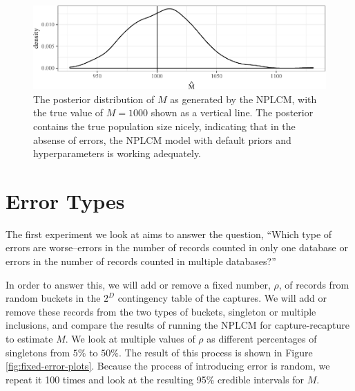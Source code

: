 \documentclass[]{article}
\begin{document}
\begin{figure}
\centering
\includegraphics{singleton_errors_files/figure-latex/true-plot-1.pdf}
\caption{\label{fig:true-plot}The posterior distribution of \(M\) as
generated by the NPLCM, with the true value of \(M = 1000\) shown as a
vertical line. The posterior contains the true population size nicely,
indicating that in the absense of errors, the NPLCM model with default
priors and hyperparameters is working adequately.}
\end{figure}

\hypertarget{error-types}{%
\section{Error Types}\label{error-types}}

The first experiment we look at aims to answer the question, ``Which
type of errors are worse--errors in the number of records counted in
only one database or errors in the number of records counted in multiple
databases?''

In order to answer this, we will add or remove a fixed number, \(\rho\),
of records from random buckets in the \(2^D\) contingency table of the
captures. We will add or remove these records from the two types of
buckets, singleton or multiple inclusions, and compare the results of
running the NPLCM for capture-recapture to estimate \(M\). We look at
multiple values of \(\rho\) as different percentages of singletons from
\(5\%\) to \(50\%\). The result of this process is shown in Figure
\ref{fig:fixed-error-plots}. Because the process of introducing error is
random, we repeat it 100 times and look at the resulting 95\% credible
intervals for \(M\).
\end{document}
